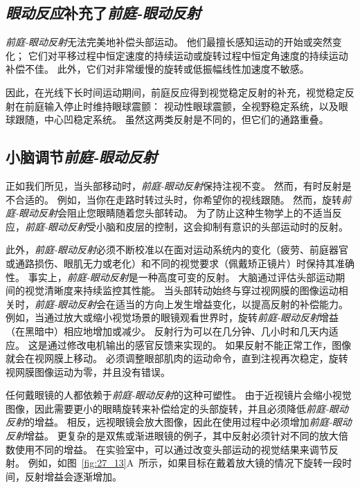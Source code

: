 \subsection{\textit{眼动反应}补充了\textit{前庭-眼动反射}}

\textit{前庭-眼动反射}无法完美地补偿头部运动。
他们最擅长感知运动的开始或突然变化；
它们对平移过程中恒定速度的持续运动或旋转过程中恒定角速度的持续运动补偿不佳。
此外，它们对非常缓慢的旋转或低振幅线性加速度不敏感。


因此，在光线下长时间运动期间，前庭反应得到视觉稳定反射的补充，视觉稳定反射在前庭输入停止时维持眼球震颤：
视动性眼球震颤，全视野稳定系统，以及眼球跟随，中心凹稳定系统。
虽然这两类反射是不同的，但它们的通路重叠。



\subsection{小脑调节\textit{前庭-眼动反射}}

正如我们所见，当头部移动时，\textit{前庭-眼动反射}保持注视不变。
然而，有时反射是不合适的。
例如，当你在走路时转过头时，你希望你的视线跟随。
然而，旋转\textit{前庭-眼动反射}会阻止您眼睛随着您头部转动。
为了防止这种生物学上的不适当反应，\textit{前庭-眼动反射}受小脑和皮层的控制，这会抑制有意识的头部运动时的反射。


此外，\textit{前庭-眼动反射}必须不断校准以在面对运动系统内的变化（疲劳、前庭器官或通路损伤、眼肌无力或老化）和不同的视觉要求（佩戴矫正镜片）时保持其准确性。
事实上，\textit{前庭-眼动反射}是一种高度可变的反射。
大脑通过评估头部运动期间的视觉清晰度来持续监控其性能。
当头部转动始终与穿过视网膜的图像运动相关时，\textit{前庭-眼动反射}会在适当的方向上发生增益变化，以提高反射的补偿能力。
例如，当通过放大或缩小视觉场景的眼镜观看世界时，旋转\textit{前庭-眼动反射}增益（在黑暗中）相应地增加或减少。
反射行为可以在几分钟、几小时和几天内适应。
这是通过修改电机输出的感官反馈来实现的。
如果反射不能正常工作，图像就会在视网膜上移动。
必须调整眼部肌肉的运动命令，直到注视再次稳定，旋转视网膜图像运动为零，并且没有错误。


任何戴眼镜的人都依赖于\textit{前庭-眼动反射}的这种可塑性。
由于近视镜片会缩小视觉图像，因此需要更小的眼睛旋转来补偿给定的头部旋转，并且必须降低\textit{前庭-眼动反射}的增益。
相反，远视眼镜会放大图像，因此在使用过程中必须增加\textit{前庭-眼动反射}增益。
更复杂的是双焦或渐进眼镜的例子，其中反射必须针对不同的放大倍数使用不同的增益。
在实验室中，可以通过改变头部运动的视觉结果来调节反射。 
例如，如图~\ref{fig:27_13}A~所示，如果目标在戴着放大镜的情况下旋转一段时间，反射增益会逐渐增加。


